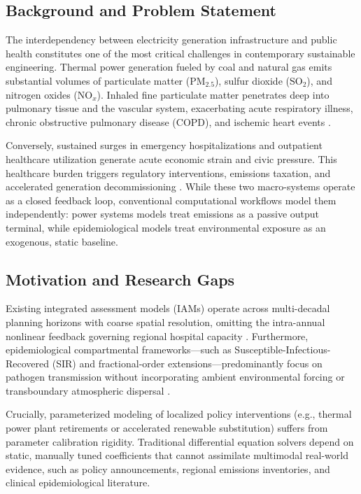 \documentclass[conference]{IEEEtran}
\renewcommand{\_}{\textunderscore\allowbreak{}}%
\begin{document}
\subsection{Background and Problem Statement}
The interdependency between electricity generation infrastructure and public health constitutes one of the most critical challenges in contemporary sustainable engineering. Thermal power generation fueled by coal and natural gas emits substantial volumes of particulate matter ($\text{PM}_{2.5}$), sulfur dioxide ($\text{SO}_2$), and nitrogen oxides ($\text{NO}_x$). Inhaled fine particulate matter penetrates deep into pulmonary tissue and the vascular system, exacerbating acute respiratory illness, chronic obstructive pulmonary disease (COPD), and ischemic heart events \cite{b_who_aqg, b_harvard_pm25}. 

Conversely, sustained surges in emergency hospitalizations and outpatient healthcare utilization generate acute economic strain and civic pressure. This healthcare burden triggers regulatory interventions, emissions taxation, and accelerated generation decommissioning \cite{b_defra_cleanair}. While these two macro-systems operate as a closed feedback loop, conventional computational workflows model them independently: power systems models treat emissions as a passive output terminal, while epidemiological models treat environmental exposure as an exogenous, static baseline. 

\subsection{Motivation and Research Gaps}
Existing integrated assessment models (IAMs) operate across multi-decadal planning horizons with coarse spatial resolution, omitting the intra-annual nonlinear feedback governing regional hospital capacity \cite{b_iam_review}. Furthermore, epidemiological compartmental frameworks—such as Susceptible-Infectious-Recovered (SIR) and fractional-order extensions—predominantly focus on pathogen transmission without incorporating ambient environmental forcing or transboundary atmospheric dispersal \cite{b_fractional_flu}.

Crucially, parameterized modeling of localized policy interventions (e.g., thermal power plant retirements or accelerated renewable substitution) suffers from parameter calibration rigidity. Traditional differential equation solvers depend on static, manually tuned coefficients that cannot assimilate multimodal real-world evidence, such as policy announcements, regional emissions inventories, and clinical epidemiological literature.
\end{document}
